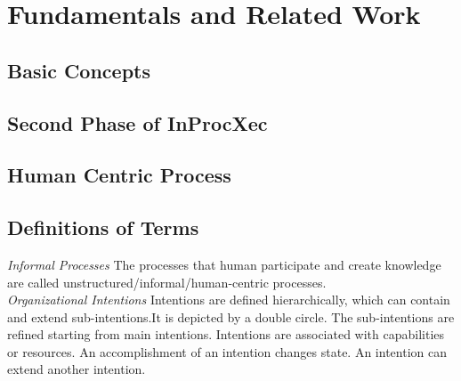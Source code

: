 \chapter{Fundamentals and Related Work}
\label{chap:fundamentals}

\section{Basic Concepts}
\label{sec:basicconcepts}

\section{Second Phase of InProcXec}
\label{sec:inproxec}

\section{Human Centric Process}
\label{sec:humancentric}


\section{Definitions of Terms}
\label{sec:termdefinitions}
\textit{Informal Processes}  The processes that human participate and create knowledge are called unstructured/informal/human-centric processes.        \\

\textit{Organizational Intentions} Intentions are defined hierarchically, which can contain and extend sub-intentions.It is depicted by a double circle. The sub-intentions are refined starting from main intentions. Intentions are associated with capabilities or resources. An accomplishment of an intention changes state. An intention can extend another intention.        \\


